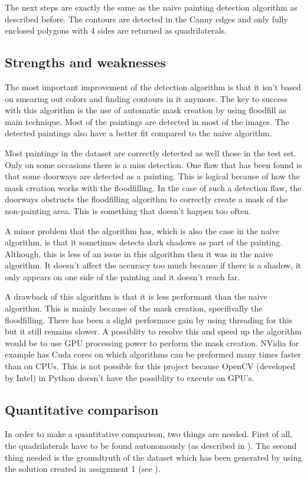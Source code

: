 The next steps are exactly the same as the naive painting detection algorithm as described before. The contours are detected in the Canny edges and only fully enclosed polygons with 4 sides are returned as quadrilaterals.

\subsection{Strengths and weaknesses}

The most important improvement of the detection algorithm is that it isn't based on smearing out colors and finding contours in it anymore. The key to success with this algorithm is the use of automatic mask creation by using floodfill as main technique. Most of the paintings are detected in most of the images. The detected paintings also have a better fit compared to the naive algorithm.

Most paintings in the dataset are correctly detected as well those in the test set. Only on some occasions there is a miss detection. One flaw that has been found is that some doorways are detected as a painting. This is logical because of how the mask creation works with the floodfilling. In the case of such a detection flaw, the doorways obstructs the floodfilling algorithm to correctly create a mask of the non-painting area. This is something that doesn't happen too often.

A minor problem that the algorithm has, which is also the case in the naive algorithm, is that it sometimes detects dark shadows as part of the painting. Although, this is less of an issue in this algorithm then it was in the naive algorithm. It doesn't affect the accuracy too much because if there is a shadow, it only appears on one side of the painting and it doesn't reach far.

A drawback of this algorithm is that it is less performant than the naive algorithm. This is mainly because of the mask creation, specifivally the floodfilling. There has been a slight performace gain by using threading for this but it still remains slower. A possiblity to resolve this and speed up the algorithm would be to use GPU processing power to perform the mask creation. NVidia for example has Cuda cores on which algorithms can be preformed many times faster than on CPUs. This is not possible for this project because OpenCV (developed by Intel) in Python doesn't have the possiblity to execute on GPU's.

\subsection{Quantitative comparison}
In order to make a quantitative comparison, two things are needed. First of all, the quadrilaterals have to be found autonomously (as described in ). The second thing needed is the groundtruth of the dataset which has been generated by using the solution created in assignment 1 (see ).


